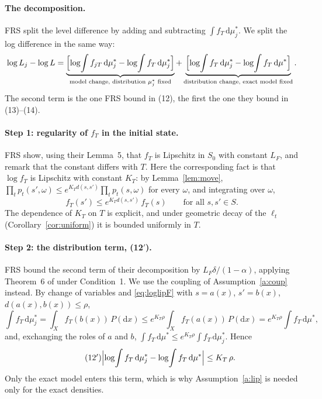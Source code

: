 \documentclass[11pt]{article}
\theoremstyle{definition}
\theoremstyle{remark}
\newcommand{\dd}{\mathrm{d}}
\begin{document}
\paragraph{The decomposition.} FRS split the level difference by adding and subtracting
$\int f_T\,\dd\mu_j^*$. We split the log difference in the same way:
\begin{equation}\label{eq:decomp}
  \log L_j - \log L
  = \underbrace{\Bigl[\log\!\int f_{jT}\,\dd\mu_j^* - \log\!\int f_T\,\dd\mu_j^*\Bigr]}_{
      \text{model change, distribution }\mu_j^*\text{ fixed}}
  + \underbrace{\Bigl[\log\!\int f_T\,\dd\mu_j^* - \log\!\int f_T\,\dd\mu^*\Bigr]}_{
      \text{distribution change, exact model fixed}} .
\end{equation}
The second term is the one FRS bound in (12), the first the one they bound in (13)--(14).

\paragraph{Step 1: regularity of $f_T$ in the initial state.} FRS show, using their Lemma~5,
that $f_T$ is Lipschitz in $S_0$ with constant $L_F$, and remark that the constant differs with
$T$. Here the corresponding fact is that $\log f_T$ is Lipschitz with constant $K_T$: by
Lemma~\ref{lem:move}, $\prod_t p_t(s',\omega) \le e^{K_T d(s,s')}\prod_t p_t(s,\omega)$ for every
$\omega$, and integrating over $\omega$,
\begin{equation}\label{eq:loglipF}
  f_T(s') \le e^{K_T d(s,s')}\,f_T(s) \qquad \text{for all } s, s' \in S .
\end{equation}
The dependence of $K_T$ on $T$ is explicit, and under geometric decay of the $\ell_t$
(Corollary~\ref{cor:uniform}) it is bounded uniformly in $T$.

\paragraph{Step 2: the distribution term, (12$'$).} FRS bound the second term of their
decomposition by $L_F\delta/(1-\alpha)$, applying Theorem~6 of \citet{SantosPeraltaAlva2005} under
Condition~1. We use the coupling of Assumption~\ref{a:coup} instead. By change of variables and
\eqref{eq:loglipF} with $s = a(x)$, $s' = b(x)$, $d(a(x),b(x)) \le \rho$,
\[
  \int f_T\,\dd\mu_j^* = \int_X f_T(b(x))\,P(\dd x) \le e^{K_T\rho}\int_X f_T(a(x))\,P(\dd x)
  = e^{K_T\rho}\int f_T\,\dd\mu^* ,
\]
and, exchanging the roles of $a$ and $b$, $\int f_T\,\dd\mu^* \le e^{K_T\rho}\int f_T\,\dd\mu_j^*$.
Hence
\begin{equation}\tag{12$'$}\label{eq:12p}
  \Bigl|\log\!\int f_T\,\dd\mu_j^* - \log\!\int f_T\,\dd\mu^*\Bigr| \le K_T\,\rho .
\end{equation}
Only the exact model enters this term, which is why Assumption~\ref{a:lip} is needed only for
the exact densities.
\end{document}
